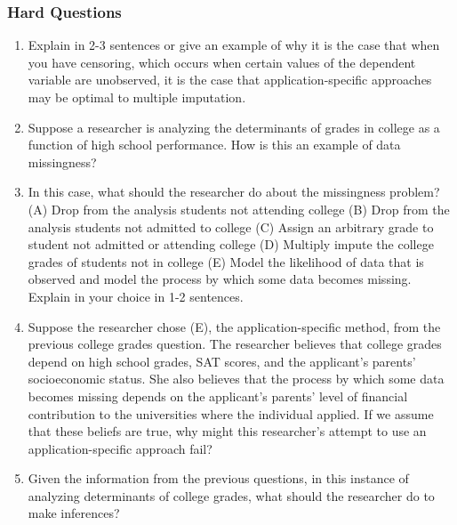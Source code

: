 \documentclass[11pt]{article}
\begin{document}
\subsubsection{Hard Questions}
\begin{enumerate}
\item Explain in 2-3 sentences or give an example of why it is the case that when you have censoring, which occurs when certain values of the dependent variable are unobserved, it is the case that application-specific approaches may be optimal to multiple imputation.
\item Suppose a researcher is analyzing the determinants of grades in college as a function of high school performance. How is this an example of data missingness?
\item In this case, what should the researcher do about the missingness problem? (A) Drop from the analysis students not attending college (B) Drop from the analysis students not admitted to college (C) Assign an arbitrary grade to student not admitted or attending college (D) Multiply impute the college grades of students not in college (E) Model the likelihood of data that is observed and model the process by which some data becomes missing. Explain in your choice in 1-2 sentences.
\item Suppose the researcher chose (E), the application-specific method, from the previous college grades question. The researcher believes that college grades depend on high school grades, SAT scores, and the applicant's parents' socioeconomic status. She also believes that the process by which some data becomes missing depends on the applicant's parents' level of financial contribution to the universities where the individual applied. If we assume that these beliefs are true, why might this researcher's attempt to use an application-specific approach fail? %
\item Given the information from the previous questions, in this instance of analyzing determinants of college grades, what should the researcher do to make inferences?  %
\end{enumerate}
\end{document}
